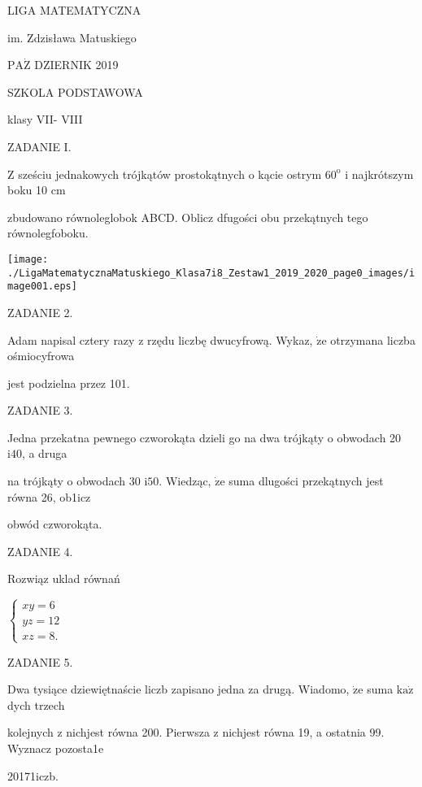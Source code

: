 \documentclass[a4paper,12pt]{article}
\begin{document}
LIGA MATEMATYCZNA

im. Zdzisława Matuskiego

$\mathrm{P}\mathrm{A}\dot{\mathrm{Z}}$ DZIERNIK 2019

SZKOLA PODSTAWOWA

klasy VII- VIII

ZADANIE I.

$\mathrm{Z}$ sześciu jednakowych trójkątów prostokątnych o kącie ostrym $60^{\mathrm{o}}$ i najkrótszym boku 10 cm

zbudowano równoleglobok ABCD. Oblicz dfugości obu przekątnych tego równolegfoboku.
\begin{center}
\texttt{[image: ./LigaMatematycznaMatuskiego\_Klasa7i8\_Zestaw1\_2019\_2020\_page0\_images/image001.eps]}
\end{center}
ZADANIE 2.

Adam napisal cztery razy z rzędu liczbę dwucyfrową. Wykaz, $\dot{\mathrm{z}}\mathrm{e}$ otrzymana liczba ośmiocyfrowa

jest podzielna przez 101.

ZADANIE 3.

Jedna przekatna pewnego czworokąta dzieli go na dwa trójkąty o obwodach 20 $\mathrm{i}40$, a druga

na trójkąty o obwodach 30 $\mathrm{i}50$. Wiedząc, $\dot{\mathrm{z}}\mathrm{e}$ suma dlugości przekątnych jest równa 26, ob1icz

obwód czworokąta.

ZADANIE 4.

Rozwiąz uklad równań

$\left\{\begin{array}{l}
xy=6\\
yz=12\\
xz=8.
\end{array}\right.$

ZADANIE 5.

Dwa tysiące dziewiętnaście liczb zapisano jedna za drugą. Wiadomo, $\dot{\mathrm{z}}\mathrm{e}$ suma $\mathrm{k}\mathrm{a}\dot{\mathrm{z}}$ dych trzech

kolejnych z nichjest równa 200. Pierwsza z nichjest równa 19, a ostatnia 99. Wyznacz pozosta1e

20171iczb.
\end{document}
